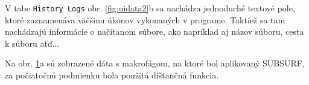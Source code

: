 \documentclass[a4paper,12pt,twoside]{article}%
\begin{document}
V tabe \texttt{History Logs} obr. \ref{fig:uidata2}b sa nachádza jednoduché textové pole, ktoré zaznamenáva väčšinu úkonov vykonaných v programe. Taktiež sa tam nachádzajú informácie o načítanom súbore, ako napríklad aj názov súboru, cesta k súboru atď...

Na obr. \ref{fig:uidata3}a sú zobrazené dáta s makrofágom, na ktoré bol aplikovaný SUBSURF, za počiatočnú podmienku bola použitá dištančná funkcia.

\begin{figure}[H]%
    \centering
    \qquad
    \caption{}%
    \label{fig:uidata3}%
\end{figure}
\end{document}
